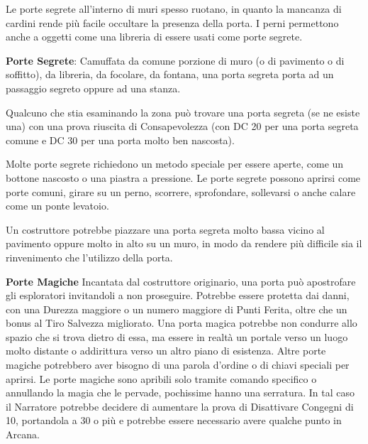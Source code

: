 \begin{multicols}{2}
Le porte segrete all'interno di muri spesso ruotano, in quanto la mancanza di cardini rende più facile occultare la presenza della porta. I perni permettono anche a oggetti come una libreria di essere usati come porte segrete.

\textbf{Porte Segrete}: Camuffata da comune porzione di muro (o di pavimento o di soffitto), da libreria, da focolare, da fontana, una porta segreta porta ad un passaggio segreto oppure ad una stanza.

Qualcuno che stia esaminando la zona può trovare una porta segreta (se ne esiste una) con una prova riuscita di Consapevolezza (con DC 20 per una porta segreta comune e DC 30 per una porta molto ben nascosta).

Molte porte segrete richiedono un metodo speciale per essere aperte, come un bottone nascosto o una piastra a pressione. Le porte segrete possono aprirsi come porte comuni, girare su un perno, scorrere, sprofondare, sollevarsi o anche calare come un ponte levatoio.

Un costruttore potrebbe piazzare una porta segreta molto bassa vicino al pavimento oppure molto in alto su un muro, in modo da rendere più difficile sia il rinvenimento che l'utilizzo della porta.

\textbf{Porte Magiche} Incantata dal costruttore originario, una porta può apostrofare gli esploratori invitandoli a non proseguire. Potrebbe essere protetta dai danni, con una Durezza maggiore o un numero maggiore di Punti Ferita, oltre che un bonus al Tiro Salvezza migliorato. Una porta magica potrebbe non condurre allo spazio che si trova dietro di essa, ma essere in realtà un portale verso un luogo molto distante o addirittura verso un altro piano di esistenza. Altre porte magiche potrebbero aver bisogno di una parola d'ordine o di chiavi speciali per aprirsi.
Le porte magiche sono apribili solo tramite comando specifico o annullando la magia che le pervade, pochissime hanno una serratura.
In tal caso il Narratore potrebbe decidere di aumentare la prova di Disattivare Congegni di 10, portandola a 30 o più e potrebbe essere necessario avere qualche punto in Arcana.



\end{multicols}

